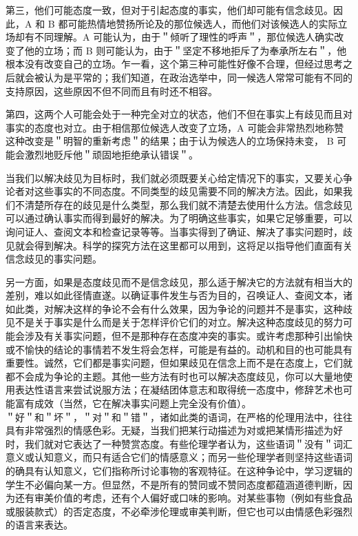 第三，他们可能态度一致，但对于引起态度的事实，他们却可能有信念歧见。因此，A 和 B 都可能热情地赞扬所论及的那位候选人，而他们对该候选人的实际立场却有不同理解。A 可能认为，由于＂倾听了理性的呼声＂，那位候选人确实改变了他的立场；而 B 则可能认为，由于＂坚定不移地拒斥了为奉承所左右＂，他根本没有改变自己的立场。乍一看，这个第三种可能性好像不合理，但经过思考之后就会被认为是平常的；我们知道，在政治选举中，同一候选人常常可能有不同的支持原因，这些原因不但不同而且有时还不相容。

第四，这两个人可能会处于一种完全对立的状态，他们不但在事实上有歧见而且对事实的态度也对立。由于相信那位候选人改变了立场，A 可能会非常热烈地称赞这种改变是＂明智的重新考虑＂的结果；由于认为候选人的立场保持未变， B 可能会激烈地贬斥他＂顽固地拒绝承认错误＂。

当我们以解决歧见为目标时，我们就必须既要关心给定情况下的事实，又要关心争论者对这些事实的不同态度。不同类型的歧见需要不同的解决方法。因此，如果我们不清楚所存在的歧见是什么类型，那么我们就不清楚去使用什么方法。信念歧见可以通过确认事实而得到最好的解决。为了明确这些事实，如果它足够重要，可以询问证人、查阅文本和检查记录等等。当事实得到了确证、解决了事实问题时，歧见就会得到解决。科学的探究方法在这里都可以用到，这将足以指导他们直面有关信念歧见的事实问题。

另一方面，如果是态度歧见而不是信念歧见，那么适于解决它的方法就有相当大的差别，难以如此径情直遂。以确证事件发生与否为目的，召唤证人、查阅文本，诸如此类，对解决这样的争论不会有什么效果，因为争论的问题并不是事实，这种歧见不是关于事实是什么而是关于怎样评价它们的对立。解决这种态度歧见的努力可能会涉及有关事实问题，但不是那种存在态度冲突的事实。或许考虑那种引出愉快或不愉快的结论的事情若不发生将会怎样，可能是有益的。动机和目的也可能具有重要性。诚然，它们都是事实问题，但如果歧见在信念上而不是在态度上，它们就都不会成为争论的主题。其他一些方法有时也可以解决态度歧见，你可以大量地使用表达性语言来尝试说服方法；在凝结团体意志和取得统一态度中，修辞艺术也可能富有成效（当然，它在解决事实问题上完全没有价值）。\\
＂好＂和＂坏＂，＂对＂和＂错＂，诸如此类的语词，在严格的伦理用法中，往往具有非常强烈的情感色彩。无疑，当我们把某行动描述为对或把某情形描述为好时，我们就对它表达了一种赞赏态度。有些伦理学者认为，这些语词＂没有＂词汇意义或认知意义，而只有适合它们的情感意义；而另一些伦理学者则坚持这些语词的确具有认知意义，它们指称所讨论事物的客观特征。在这种争论中，学习逻辑的学生不必偏向某一方。但显然，不是所有的赞同或不赞同态度都蕴涵道德判断，因为还有审美价值的考虑，还有个人偏好或口味的影响。对某些事物（例如有些食品或服装款式）的否定态度，不必牵涉伦理或审美判断，但它也可以由情感色彩强烈的语言来表达。

